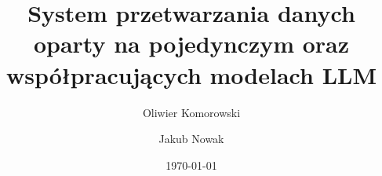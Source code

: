 \title{System przetwarzania danych oparty na pojedynczym oraz współpracujących modelach LLM}
\author{
    Oliwier Komorowski
    \and
    Jakub Nowak
}
\date{\today}